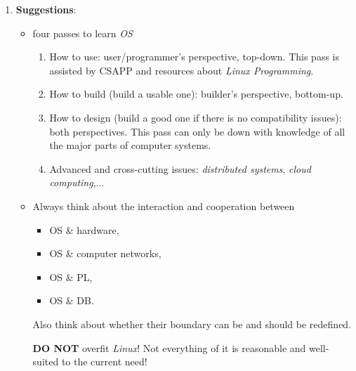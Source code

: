 \documentclass{article}
\begin{document}
\begin{enumerate}
\begin{itemize}
    \end{itemize}
    \item \textbf{Suggestions}:
    \begin{itemize}
        \item four passes to learn \emph{OS}
            \begin{enumerate}
                \item How to use: user/programmer's perspective, top-down.
                This pass is assisted by CSAPP and resources about \emph{Linux Programming}.
                \item How to build (build a usable one): builder's perspective, bottom-up.
                \item How to design (build a good one if there is no compatibility issues): both perspectives.
                This pass can only be down with knowledge of all the major parts of computer systems.
                \item Advanced and cross-cutting issues:
                \emph{distributed systems}, \emph{cloud computing},...
            \end{enumerate}
        \item Always think about the interaction and cooperation between
        \begin{itemize}
            \item OS \& hardware,
            \item OS \& computer networks,
            \item OS \& PL,
            \item OS \& DB.
        \end{itemize}
        Also think about whether their boundary can be and should be redefined.
        
        \textbf{DO NOT} overfit \emph{Linux}!
        Not everything of it is reasonable and well-suited to the current need!
    \end{itemize}

\end{enumerate}
\end{document}
